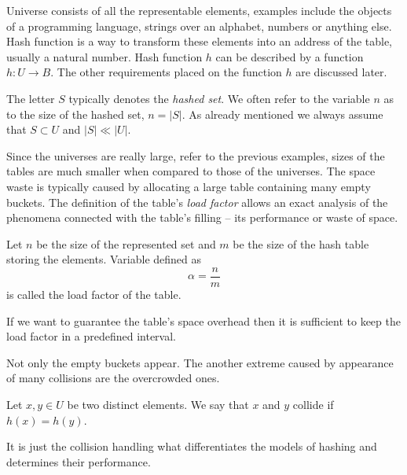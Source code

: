 Universe consists of all the representable elements, examples include the objects of a programming language, strings over an alphabet, numbers or anything else. Hash function is a way to transform these elements into an address of the table, usually a natural number. Hash function $h$ can be described by a function $h: U \rightarrow B$. The other requirements placed on the function $h$ are discussed later.

The letter $S$ typically denotes the \emph{hashed set}. We often refer to the variable $n$ as to the size of the hashed set, $n = |S|$. As already mentioned we always assume that $S \subset U$ and $|S| \ll |U|$.

Since the universes are really large, refer to the previous examples, sizes of the tables are much smaller when compared to those of the universes. The space waste is typically caused by allocating a large table containing many empty buckets. The definition of the table's \emph{load factor} allows an exact analysis of the phenomena connected with the table's filling -- its performance or waste of space.

\begin{definition}
\label{definition-load-factor}
Let $n$ be the size of the represented set and $m$ be the size of the hash table storing the elements. Variable defined as \[ \alpha = \frac{n}{m} \] is called the load factor of the table.
\end{definition}

If we want to guarantee the table's space overhead then it is sufficient to keep the load factor in a predefined interval.

Not only the empty buckets appear. The another extreme caused by appearance of many collisions are the overcrowded ones. 
\begin{definition}[Collision]
\label{definition-collision}
Let $x, y \in U$ be two distinct elements. We say that $x$ and $y$ collide if $h(x) = h(y)$.
\end{definition}

It is just the collision handling what differentiates the models of hashing and determines their performance.

